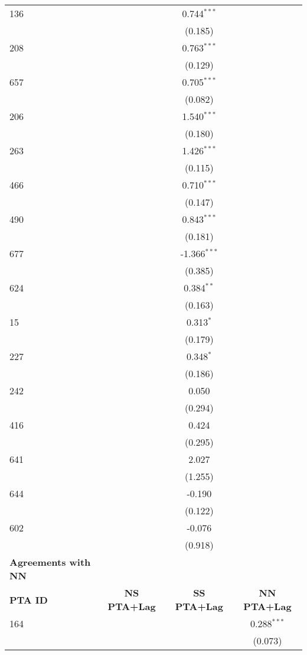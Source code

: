 \begin{longtable}{lccc}
    136 &  & 0.744$^{\ast\ast\ast}$ &  \\
    &  & (0.185) &  \\
    208 &  & 0.763$^{\ast\ast\ast}$ &  \\
    &  & (0.129) &  \\
    657 &  & 0.705$^{\ast\ast\ast}$ &  \\
    &  & (0.082) &  \\
    206 &  & 1.540$^{\ast\ast\ast}$ &  \\
    &  & (0.180) &  \\
    263 &  & 1.426$^{\ast\ast\ast}$ &  \\
    &  & (0.115) &  \\
    466 &  & 0.710$^{\ast\ast\ast}$ &  \\
    &  & (0.147) &  \\
    490 &  & 0.843$^{\ast\ast\ast}$ &  \\
    &  & (0.181) &  \\
    677 &  & -1.366$^{\ast\ast\ast}$ &  \\
    &  & (0.385) &  \\
    624 &  & 0.384$^{\ast\ast}$ &  \\
    &  & (0.163) &  \\
    15  &  & 0.313$^{\ast}$ &  \\
    &  & (0.179) &  \\
    227  &  & 0.348$^{\ast}$ &  \\
    &  & (0.186) &  \\
    242  &  & 0.050 &  \\
    &  & (0.294) &  \\
    416  &  & 0.424 &  \\
    &  & (0.295) &  \\
    641  &  & 2.027 &  \\
    &  & (1.255) &  \\
    644  &  & -0.190 &  \\
    &  & (0.122) &  \\
    602  &  & -0.076 &  \\
    &  & (0.918) &  \\
    \hline
    \textbf{Agreements with NN} &  &  &  \\
    \hline
    \textbf{PTA ID} & \textbf{NS PTA+Lag} & \textbf{SS PTA+Lag} & \textbf{NN PTA+Lag} \\
    \hline
    164 &  &  & 0.288$^{\ast\ast\ast}$ \\
    &  &  & (0.073) \\

\end{longtable}

